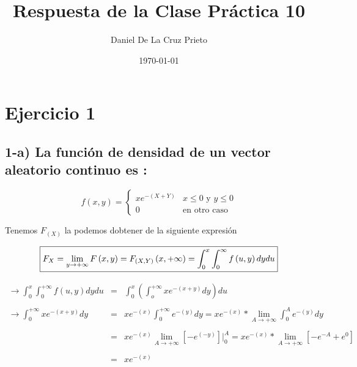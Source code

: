 \documentclass[12pt]{article}
\begin{document}
	\title{Respuesta de la Clase Pr\'actica 10}
	\author{Daniel De La Cruz Prieto}
	\date{\today}
	
    \maketitle
    
    \section*{Ejercicio 1 } 

    \subsection*{ 1-a) La funci\'on de densidad de un vector aleatorio continuo es :}

    \begin{equation*}
        f\left(x,y\right) = \begin{cases}
    
        xe^{-\left(X+Y\right)} & \mbox{$x\leq0$ y $y\leq 0$}
        \\
               0             & \mbox{en otro caso}
    
       \end{cases}
    \end{equation*}

    \begin{flushleft}
        Tenemos $F_{\left(X\right)}$ la podemos dobtener de la siguiente expresi\'on
    \end{flushleft}

   	\begin{equation*} 
	    \fbox{$
	   	F_{X} =  \displaystyle \lim_{y \to + \infty} F\left(x,y\right) = \displaystyle  F_{\left(X,Y\right)} \left(x,+\infty\right) = \int_{0}^{x}\int_{0}^\infty f\left(u,y\right) dy du	   	
	   	$}
    \end{equation*} 

	\begin{equation*} 
	    \begin{array}{rcl}
	        \to\int_{0}^{x} \int_{0}^{+\infty} f \left(u,y\right) dy du & = &  \int_{0}^{x} \left(\int_{o}^{+ \infty}xe^{-\left(x + y\right)} dy\right)du
	        \\
	        \\
	        \to \int_{0}^{+ \infty} xe^{-\left(x+y\right)}dy & = & xe ^{-\left(x\right)} \int_{0}^{+ \infty} e^{-\left(y\right)}dy = \displaystyle xe^{-\left(x\right)} * \lim_{A\to + \infty} \int_{0}^{A} e^{-\left(y\right)} dy
	        \\
	        \\
	        & = &\displaystyle xe^{-\left(x\right)}  \lim_{A\to+\infty} \left[ -e^{\left(-y\right)}\right]\vert_{0}^{A}   = \displaystyle xe^{-\left(x\right)}* \lim_{A\to+\infty} \left[ -e^{-A} + e^0\right]
	        \\
	        \\
            & = & xe^{-\left(x\right)}
            \\
	    \end{array}
    \end{equation*}        
  
\end{document}
